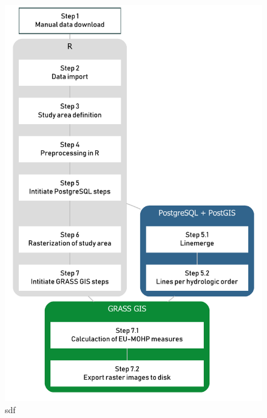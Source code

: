 \documentclass[fleqn,10pt]{wlscirep}
\begin{document}
\begin{figure}

{\centering \includegraphics[width=0.7\linewidth]{diagramms/flowchart} 

}

\caption{sdf}\label{fig:flowchart}
\end{figure}


\end{document}

